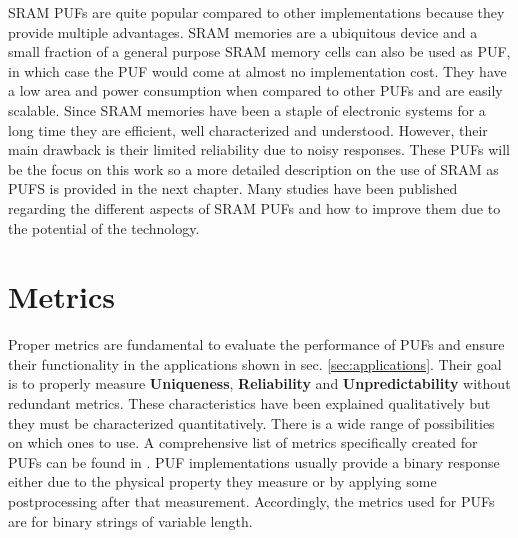  SRAM PUFs are quite popular compared to other implementations \cite{Xiao2014,Zhang2020,Akhundov2019,Hofer2010} because they provide multiple advantages. SRAM memories are a ubiquitous device and a small fraction of a general purpose SRAM memory cells can also be used as PUF, in which case the PUF would come at almost no implementation cost. They have a low area and power consumption when compared to other PUFs and are easily scalable. Since SRAM memories have been a staple of electronic systems for a long time they are efficient, well characterized and understood. However, their main drawback is their limited reliability due to noisy responses. These PUFs will be the focus on this work so a more detailed description on the use of SRAM as PUFS is provided in the next chapter. Many studies have been published regarding the different aspects of SRAM PUFs and how to improve them due to the potential of the technology.







\section{Metrics}
\label{sec:Metrics}

Proper metrics are fundamental to evaluate the performance of PUFs and ensure their functionality in the applications shown in sec. \ref{sec:applications}. Their goal is to properly measure \textbf{Uniqueness}, \textbf{Reliability} and \textbf{Unpredictability} without redundant metrics. These characteristics have been explained qualitatively but they must be characterized quantitatively. There is a wide range of possibilities on which ones to use. A comprehensive list of metrics specifically created for PUFs can be found in \cite{Maiti2013}. PUF implementations usually provide a binary response either due to the physical property they measure or by applying some postprocessing after that measurement. Accordingly, the metrics used for PUFs are for binary strings of variable length. 


